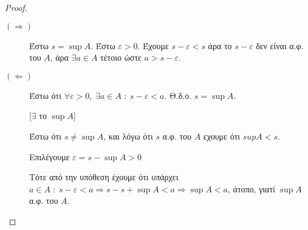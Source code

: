 \documentclass[main.tex]{subfiles}
\begin{document}
\begin{proof}
\item {}
  \begin{description}
    \item[$ (\Rightarrow) $] 
      Έστω $ s = \sup A $. Έστω $ \varepsilon >0 $. Έχουμε $ 
      s - \varepsilon < s $ άρα το $ s- \varepsilon $ δεν είναι 
      α.φ. του $A$, άρα $ \exists a \in A $ τέτοιο ώστε $ 
      a > s- \varepsilon$. 

    \item [$ (\Leftarrow) $] 
      Έστω ότι $ \forall \varepsilon >0, \; \exists a \in A \; : 
      \; s- \varepsilon < a$. Θ.δ.ο. $ s = \sup A $. 


      \begin{minipage}{0.23\textwidth}
      \end{minipage}

      [$ \exists $ το $ \sup A $]

      Έστω ότι $ s \neq \sup A $, και λόγω ότι $ s $ α.φ. του $A$ 
      εχουμε ότι $sup A < s $. 

      Επιλέγουμε $ \varepsilon = s - \sup A > 0 $

      Τότε από την υπόθεση έχουμε ότι 
      υπάρχει $ a \in A \; : \; s - \varepsilon < a \Rightarrow s 
      - s + \sup A < a \Rightarrow \sup A < a $, άτοπο, γιατί 
      $ \sup A $ α.φ. του $A$.  
  \end{description} 
\end{proof}


\end{document}
